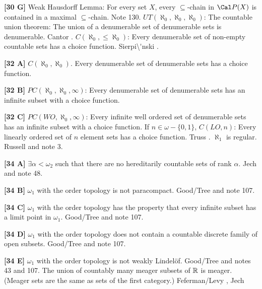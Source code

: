 \item{}{\bf [30 G]} Weak Hausdorff Lemma:  For every set $X$, every
$\subseteq$-chain in $\Cal P(X)$ is contained in a maximal
$\subseteq$-chain.  Note 130. 
\medskip
{} $UT(\aleph_{0},\aleph_{0},\aleph_{0})$:
The countable union theorem:   The union of a denumerable set
of denumerable sets is denumerable.  \ac{Cantor} \cite{1878}.
\medskip
{} $C(\aleph_0,\le\aleph_0)$: Every denumerable set of
non-empty countable sets  has a choice function.  \ac{Sierpi\'nski}
\cite{1918}.
\smallskip
\item{}{\bf [32 A]}  $C(\aleph_{0},\aleph_{0})$. Every denumerable
set of denumerable sets has a choice function.
\smallskip
\item{}{\bf [32 B]} $PC(\aleph_0,\aleph_0,\infty)$: Every denumerable
set of denumerable sets has an infinite subset with a choice function.
\smallskip
\item{}{\bf [32 C]} $PC(WO,\aleph_0,\infty)$: Every infinite well
ordered set of denumerable sets has an infinite subset with a choice
function.
\medskip
{} If $n\in\omega-\{0,1\}$, $C(LO,n)$:  Every
linearly ordered set of $n$ element sets has  a choice function.
\ac{Truss} \cite{1973a}.
\medskip
{} $\aleph_{1}$ is regular. \ac{Russell}
\cite{1906} and note 3.
\smallskip
\item{}{\bf [34 A]} $\exists\alpha < \omega_2$ such that there are no
hereditarily countable sets of rank $\alpha$.  \ac{Jech} \cite{1982} and
note 48.
\smallskip
\item{}{\bf [34 B]} $\omega_1$ with the order topology is not
paracompact.  \ac{Good/Tree} \cite{1995} and note 107.
\smallskip
\item{}{\bf [34 C]} $\omega_1$ with the order topology has the property
that every infinite subset has a limit point in $\omega_1$.
\ac{Good/Tree} \cite{1995} and note 107.
\smallskip
\item{}{\bf [34 D]} $\omega_1$ with the order topology does not contain
a countable discrete family of open subsets.
\ac{Good/Tree} \cite{1995} and note 107.
\smallskip
\item{}{\bf [34 E]} $\omega_1$ with the order topology is not weakly
Lindel\"of.  \ac{Good/Tree} \cite{1995} and notes 43 and 107.
\medskip
{} The union of countably many meager subsets
of ${\Bbb R}$ is meager. (Meager sets are the same as sets of the
first category.) \ac{Feferman/Levy} \cite{1963}, \ac{Jech} \cite{1973b}
